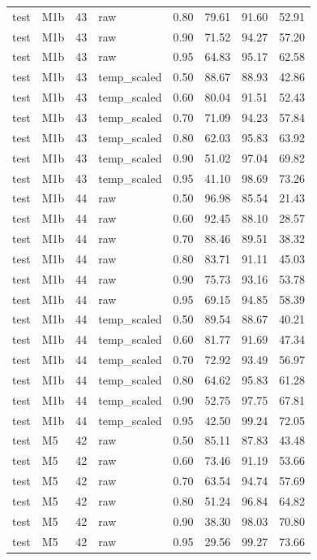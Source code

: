 \begin{tabular}{llrlrrrr}
test & M1b & 43 & raw & 0.80 & 79.61 & 91.60 & 52.91 \\
test & M1b & 43 & raw & 0.90 & 71.52 & 94.27 & 57.20 \\
test & M1b & 43 & raw & 0.95 & 64.83 & 95.17 & 62.58 \\
test & M1b & 43 & temp\_scaled & 0.50 & 88.67 & 88.93 & 42.86 \\
test & M1b & 43 & temp\_scaled & 0.60 & 80.04 & 91.51 & 52.43 \\
test & M1b & 43 & temp\_scaled & 0.70 & 71.09 & 94.23 & 57.84 \\
test & M1b & 43 & temp\_scaled & 0.80 & 62.03 & 95.83 & 63.92 \\
test & M1b & 43 & temp\_scaled & 0.90 & 51.02 & 97.04 & 69.82 \\
test & M1b & 43 & temp\_scaled & 0.95 & 41.10 & 98.69 & 73.26 \\
test & M1b & 44 & raw & 0.50 & 96.98 & 85.54 & 21.43 \\
test & M1b & 44 & raw & 0.60 & 92.45 & 88.10 & 28.57 \\
test & M1b & 44 & raw & 0.70 & 88.46 & 89.51 & 38.32 \\
test & M1b & 44 & raw & 0.80 & 83.71 & 91.11 & 45.03 \\
test & M1b & 44 & raw & 0.90 & 75.73 & 93.16 & 53.78 \\
test & M1b & 44 & raw & 0.95 & 69.15 & 94.85 & 58.39 \\
test & M1b & 44 & temp\_scaled & 0.50 & 89.54 & 88.67 & 40.21 \\
test & M1b & 44 & temp\_scaled & 0.60 & 81.77 & 91.69 & 47.34 \\
test & M1b & 44 & temp\_scaled & 0.70 & 72.92 & 93.49 & 56.97 \\
test & M1b & 44 & temp\_scaled & 0.80 & 64.62 & 95.83 & 61.28 \\
test & M1b & 44 & temp\_scaled & 0.90 & 52.75 & 97.75 & 67.81 \\
test & M1b & 44 & temp\_scaled & 0.95 & 42.50 & 99.24 & 72.05 \\
test & M5 & 42 & raw & 0.50 & 85.11 & 87.83 & 43.48 \\
test & M5 & 42 & raw & 0.60 & 73.46 & 91.19 & 53.66 \\
test & M5 & 42 & raw & 0.70 & 63.54 & 94.74 & 57.69 \\
test & M5 & 42 & raw & 0.80 & 51.24 & 96.84 & 64.82 \\
test & M5 & 42 & raw & 0.90 & 38.30 & 98.03 & 70.80 \\
test & M5 & 42 & raw & 0.95 & 29.56 & 99.27 & 73.66 \\

\end{tabular}
